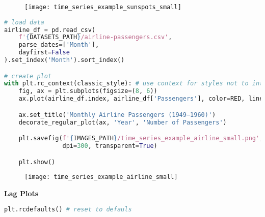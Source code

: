 \begin{figure}[h!]
  \centering
  \texttt{[image: time\_series\_example\_sunspots\_small]}
\end{figure}\newpage


\begin{center}
  \begin{lstlisting}[language=Python, 
  caption={Пассажиры авиалиний.}, 
  label={lst:time_series_example_airline_small}]
# load data
airline_df = pd.read_csv(
    f'{DATASETS_PATH}/airline-passengers.csv',
    parse_dates=['Month'],
    dayfirst=False
).set_index('Month').sort_index()

# create plot
with plt.rc_context(classic_style): # use context for styles not to interfere
    fig, ax = plt.subplots(figsize=(8, 6))
    ax.plot(airline_df.index, airline_df['Passengers'], color=RED, linewidth=1.5)

    ax.set_title('Monthly Airline Passengers (1949–1960)')
    decorate_regular_plot(ax, 'Year', 'Number of Passengers')

    plt.savefig(f'{IMAGES_PATH}/time_series_example_airline_small.png', 
                dpi=300, transparent=True)

    plt.show()
  \end{lstlisting}
\end{center}

\begin{figure}[h!]
  \centering
  \texttt{[image: time\_series\_example\_airline\_small]}
\end{figure}\newpage


\begin{center}
  \noindent\normalsize\bfseries
  Lag Plots
\end{center}\vspace{-17.5pt}

\begin{center}
  \begin{lstlisting}[language=Python]
plt.rcdefaults() # reset to defauls
  \end{lstlisting}
\end{center}


